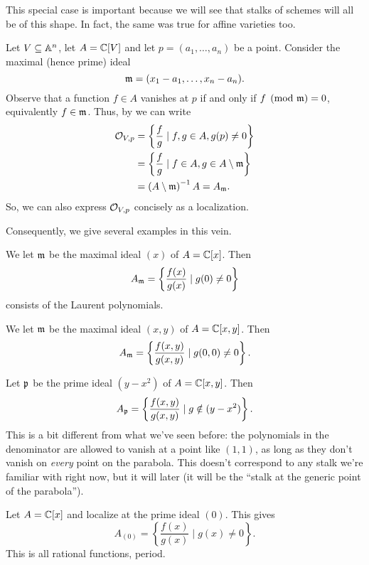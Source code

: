 This special case is important because we will see that
stalks of schemes will all be of this shape.
In fact, the same was true for affine varieties too.
\begin{example}
	Let $V \subseteq \mathbb A^n$, let $A = \mathbb C[V]$
	and let $p = (a_1, \dots, a_n)$ be a point.
	Consider the maximal (hence prime) ideal
	\[ \mathfrak m = (x_1 - a_1, \dots, x_n - a_n). \]
	Observe that a function $f \in A$ vanishes at $p$
	if and only if $f \pmod{\mathfrak m} = 0$, equivalently $f \in \mathfrak m$.
	Thus, by  we can write
	\begin{align*}
		\mathcal O_{V,p} &= \left\{ \frac{f}{g} \mid f,g \in A, g(p) \ne 0 \right\} \\
		&= \left\{ \frac{f}{g} \mid f \in A, g \in A \setminus \mathfrak m \right\} \\
		&= \left( A \setminus \mathfrak m \right)^{-1} A = A_\mathfrak m.
	\end{align*}
	So, we can also express $\mathcal O_{V,p}$ concisely as a localization.
\end{example}
Consequently, we give several examples in this vein.

\begin{example}
	\listhack
	\begin{enumerate}[(a)]
		\ii We let $\mathfrak m$ be the maximal ideal $(x)$ of $A = \mathbb C[x]$.
		Then \[ A_\mathfrak m = \left\{ \frac{f(x)}{g(x)} \mid g(0) \ne 0 \right\} \]
		consists of the Laurent polynomials.

		\ii We let $\mathfrak m$ be the maximal ideal $(x,y)$ of $A = \mathbb C[x,y]$.
		Then \[ A_\mathfrak m = \left\{ \frac{f(x,y)}{g(x,y)} \mid g(0,0) \ne 0 \right\}. \]

		\ii Let $\mathfrak p$ be the prime ideal $(y-x^2)$ of $A = \mathbb C[x,y]$.
		Then
		\[ A_\mathfrak p = \left\{ \frac{f(x,y)}{g(x,y)} \mid g \notin (y-x^2) \right\}. \]
		This is a bit different from what we've seen before:
		the polynomials in the denominator are allowed to vanish
		at a point like $(1,1)$, as long as they don't vanish on
		\emph{every} point on the parabola.
		This doesn't correspond to any stalk we're familiar with right now,
		but it will later
		(it will be the ``stalk at the generic point of the parabola'').

		\ii Let $A = \mathbb C[x]$ and localize at the prime ideal $(0)$.
		This gives \[ A_{(0)} = \left\{ \frac{f(x)}{g(x)} \mid g(x) \ne 0 \right\}. \]
		This is all rational functions, period.
	\end{enumerate}
\end{example}

